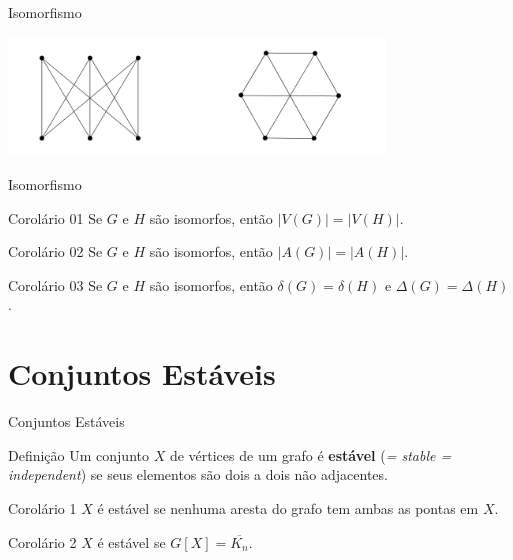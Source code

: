\documentclass[xcolor=dvipsnames,table]{beamer}
\begin{document}
	\begin{frame}{Isomorfismo}
		\begin{center}
			\includegraphics[width=10cm]{images/isomorfismo03.png}
		\end{center}
	\end{frame}
	
	\begin{frame}{Isomorfismo}
		\begin{block}{Corolário 01}
			Se $G$ e $H$ são isomorfos, então $|V(G)| = |V(H)|$.
		\end{block}
		\begin{block}{Corolário 02}
			Se $G$ e $H$ são isomorfos, então $|A(G)| = |A(H)|$.
		\end{block}
		\begin{block}{Corolário 03}
			Se $G$ e $H$ são isomorfos, então $\delta(G) = \delta(H)$ e $\Delta(G) = \Delta(H)$.
		\end{block}
	\end{frame}
	
	\section{Conjuntos Estáveis}
	\begin{frame}{Conjuntos Estáveis}
		\begin{block}{Definição}
			Um conjunto $X$ de vértices de um grafo é {\bf estável} ({\it = stable = independent}) se seus elementos são dois a dois não adjacentes.
		\end{block} \pause
		\begin{block}{Corolário 1}
			$X$ é estável se nenhuma aresta do grafo tem ambas as pontas em $X$.
		\end{block} \pause
		\begin{block}{Corolário 2}
			$X$ é estável se $G[X] = \overline{K_n}$.
		\end{block} 
	\end{frame}
	
\end{document}
